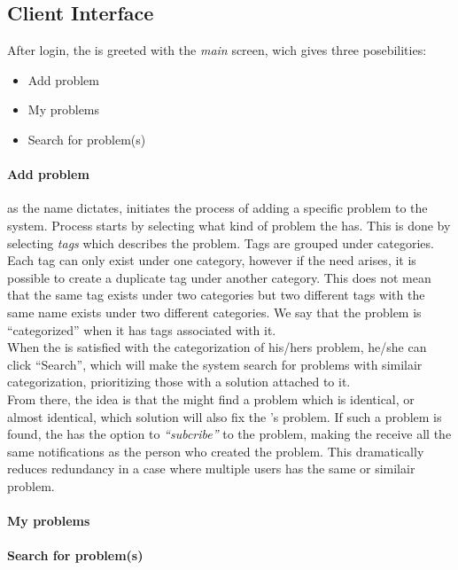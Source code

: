 \subsection{Client Interface}
\label{sec:client_interface}

After login, the \aclient[] is greeted with the \textit{main} screen, wich gives three posebilities:
\begin{itemize}
	\item Add problem
	\item My problems
	\item Search for problem(s)
\end{itemize}

\paragraph{Add problem} as the name dictates, initiates the process of adding a specific problem to the system. Process starts by selecting what kind of problem the \aclient[] has. This is done by selecting \textit{tags} which describes the problem. Tags are grouped under categories. Each tag can only exist under one category, however if the need arises, it is possible to create a duplicate tag under another category. This does not mean that the same tag exists under two categories but two different tags with the same name exists under two different categories. We say that the problem is ``categorized'' when it has tags associated with it.\\
When the \aclient[] is satisfied with the categorization of his/hers problem, he/she can click ``Search'', which will make the system search for problems with similair categorization, prioritizing those with a solution attached to it.\\
From there, the idea is that the \aclient[] might find a problem which is identical, or almost identical, which solution will also fix the \aclient 's problem. If such a problem is found, the \aclient[] has the option to \textit{``subcribe''} to the problem, making the \aclient[] receive all the same notifications as the person who created the problem. This dramatically reduces redundancy in a case where multiple users has the same or similair problem.
\paragraph{My problems}
\paragraph{Search for problem(s)}



